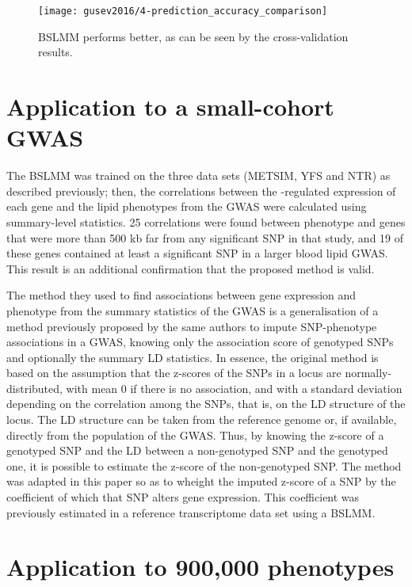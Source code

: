 \documentclass[../main.tex]{subfiles}
\begin{document}
\begin{figure}
	\texttt{[image: gusev2016/4-prediction\_accuracy\_comparison]}
	\caption{BSLMM performs better, as can be seen by the 
		cross-validation results.}
\end{figure}

\section{Application to a small-cohort GWAS}

The BSLMM was trained on the three data sets (METSIM, YFS and NTR) as 
described previously; then, the correlations between the \cis-regulated 
expression of each gene and the lipid phenotypes from the GWAS were 
calculated using summary-level statistics. 25 correlations were found 
between phenotype and genes that were more than 500 kb far from any 
significant SNP in that study, and 19 of these genes contained at least 
a significant SNP in a larger blood lipid GWAS. This result is an 
additional confirmation that the proposed method is valid.

The method they used to find associations between gene expression and 
phenotype from the summary statistics of the GWAS is a generalisation of 
a method previously proposed by the same authors to impute SNP-phenotype 
associations in a GWAS, knowing only the association score of genotyped 
SNPs\autocite{Pasaniuc2014} and optionally the summary LD statistics. In 
essence, the original method is based on the assumption that the 
z-scores of the SNPs in a locus are normally-distributed, with mean 0 
if there is no association, and with a standard deviation depending on 
the correlation among the SNPs, that is, on the LD structure of the 
locus. The LD structure can be taken from the reference genome or, if 
available, directly from the population of the GWAS. Thus, by knowing 
the z-score of a genotyped SNP and the LD between a non-genotyped SNP 
and the genotyped one, it is possible to estimate the z-score of the 
non-genotyped SNP. The method was adapted in this paper so as to wheight 
the imputed z-score of a SNP by the coefficient of which that SNP alters 
gene expression. This coefficient was previously estimated in a 
reference transcriptome data set using a BSLMM.

\section{Application to 900,000 phenotypes}
\end{document}
